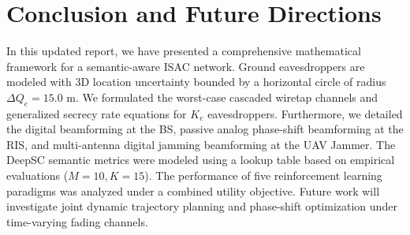 \documentclass[journal,onecolumn]{IEEEtran}
\begin{document}
\section{Conclusion and Future Directions}
In this updated report, we have presented a comprehensive mathematical framework for a semantic-aware ISAC network. Ground eavesdroppers are modeled with 3D location uncertainty bounded by a horizontal circle of radius $\Delta Q_e = 15.0\text{ m}$. We formulated the worst-case cascaded wiretap channels and generalized secrecy rate equations for $K_e$ eavesdroppers. Furthermore, we detailed the digital beamforming at the BS, passive analog phase-shift beamforming at the RIS, and multi-antenna digital jamming beamforming at the UAV Jammer. The DeepSC semantic metrics were modeled using a lookup table based on empirical evaluations ($M=10, K=15$). The performance of five reinforcement learning paradigms was analyzed under a combined utility objective. Future work will investigate joint dynamic trajectory planning and phase-shift optimization under time-varying fading channels.


\end{document}
